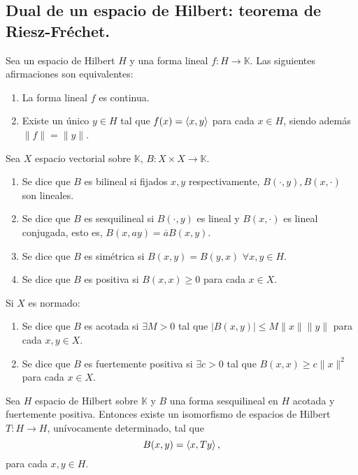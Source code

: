 \subsection{Dual de un espacio de Hilbert: teorema de Riesz-Fréchet.}

\begin{theorem}\label{th:riesz}
  Sea un espacio de Hilbert $H$ y una forma lineal $f:H\to \mathbb{K}$. Las
  siguientes afirmaciones son equivalentes:
  \begin{enumerate}
    \item La forma lineal $f$ es continua.
    \item Existe un único $y\in H$ tal que $f(x)=\left\langle x,y\right\rangle$ para cada $x\in
      H$, siendo además $\|f\|=\|y\|$.
  \end{enumerate}
\end{theorem}

\begin{definition}
  Sea $X$ espacio vectorial sobre $\mathbb{K}$, $B:X \times X\to \mathbb{K}$.
  \begin{enumerate}
    \item Se dice que $B$ es bilineal si fijados $x,y$ respectivamente, $B(\cdot
      ,y),B(x,\cdot )$ son lineales.
    \item Se dice que $B$ es sesquilineal si $B(\cdot ,y)$ es lineal y
      $B(x,\cdot )$ es lineal conjugada, esto es,
      $B(x,ay)=\overline{a}B(x,y)$.
    \item Se dice que $B$ es simétrica si $B(x,y)=B(y,x)$ $\forall x,y\in H$.
    \item Se dice que $B$ es positiva si $B(x,x)\ge 0$ para cada $x\in X$.
  \end{enumerate}

  Si $X$ es normado:

  \begin{enumerate}
    \item Se dice que $B$ es acotada si $\exists M>0$ tal que $|B(x,y)|\le
      M\|x\|\|y\|$ para cada $x,y\in X$.
    \item Se dice que $B$ es fuertemente positiva si $\exists c>0$ tal que
      $B(x,x)\ge c\|x\|^2$ para cada $x\in X$.
  \end{enumerate}
\end{definition}

\begin{theorem}\label{th:lax-milgram}
  Sea $H$ espacio de Hilbert sobre $\mathbb{K}$ y $B$ una forma sesquilineal en
  $H$ acotada y fuertemente positiva. Entonces existe un isomorfismo de espacios
  de Hilbert $T:H\to H$, unívocamente determinado, tal que
  \[
  B(x,y)=\left\langle x,Ty\right\rangle
  ,\] 
  para cada $x,y\in H$.
\end{theorem}
